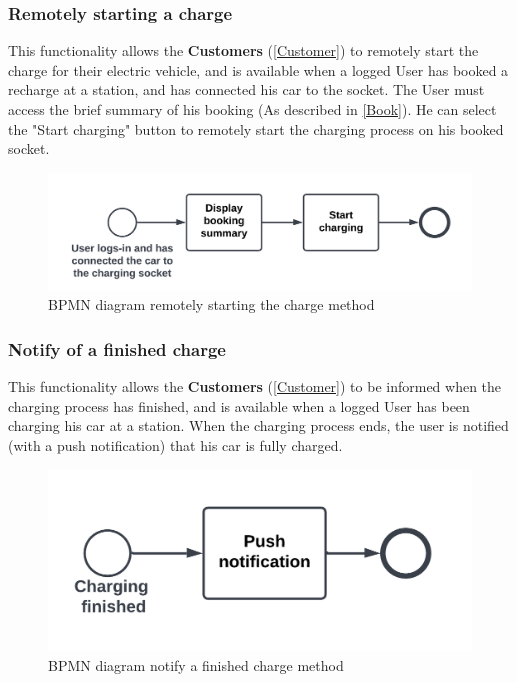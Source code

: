 \subsubsection{Remotely starting a charge}
This functionality allows the \textbf{Customers} (\ref{Customer}) to remotely start the charge for their electric vehicle, and is available when a logged User has booked a recharge at a station, and has connected his car to the socket. 
The User must access the brief summary of his booking (As described in \ref{Book}).
He can select the "Start charging" button to remotely start the charging process on his booked socket.
\begin{figure}[H]
    \begin{center}
        \includegraphics[scale=0.2]{img/fun-rem-ch.png}
        \caption{BPMN diagram remotely starting the charge method}
    \end{center}
\end{figure}
\subsubsection{Notify of a finished charge}
This functionality allows the \textbf{Customers} (\ref{Customer}) to be informed when the charging process has finished, and is available when a logged User has been charging his car at a station.
When the charging process ends, the user is notified (with a push notification) that his car is fully charged.
\begin{figure}[H]
    \begin{center}
        \includegraphics[scale=0.2]{img/fun-not-fin.png}
        \caption{BPMN diagram notify a finished charge method}
    \end{center}
\end{figure}
